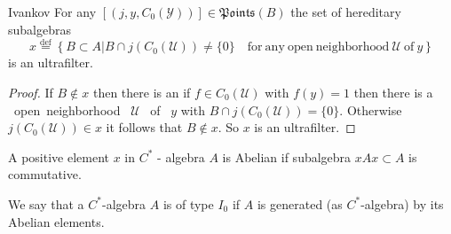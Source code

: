 \documentclass{beamer}
\theoremstyle{plain}
\newcommand{\sU}{\mathcal{U}}       %
\newcommand{\sY}{\mathcal{Y}}       %
\newcommand{\bydef}{\stackrel{\mathrm{def}}{=}}
\begin{document}
\begin{frame}
\begin{lemma}\alert{Ivankov}
	For any 	$\left[\left( j, y,  C_0\left( \sY\right)\right)\right]\in \mathfrak{Points}\left(B \right)$ the set of hereditary subalgebras
	$$
	x \bydef \left\{B \subset A \left| B \cap j\left( C_0\left( \sU\right)\right) \neq \{0\}\quad \mathrm{for~any~open~neighborhood~} \sU \mathrm{~of~} y \right.\right\}	
	$$
	is an ultrafilter.
\end{lemma}
	\begin{proof}
	If $B \notin x$ then there is an 
if $f \in C_0\left( \sU\right)$ with $f\left(y \right) = 1$ then there is a ~open~neighborhood~ $\sU$ {~of~} $y$ with  $ B \cap j\left( C_0\left( \sU\right)\right) = \{0\}$. Otherwise $j\left( C_0\left( \sU\right)\right)\in x$ it follows that $B\notin x$. So $x$ is an ultrafilter.
	\end{proof}
\end{frame}
\begin{frame}
	\begin{definition}
		A positive element $x$ in $C^*$ - algebra $A$ is \alert{Abelian} if subalgebra $xAx \subset A$ is commutative.
	\end{definition}
	\begin{definition}\label{type_I_defn}
		We say that a $C^*$-algebra $A$ is \alert{of type} $I_0$ if $A$ is generated (as $C^*$-algebra) by its Abelian elements.
	\end{definition}

\end{frame}
\end{document}
